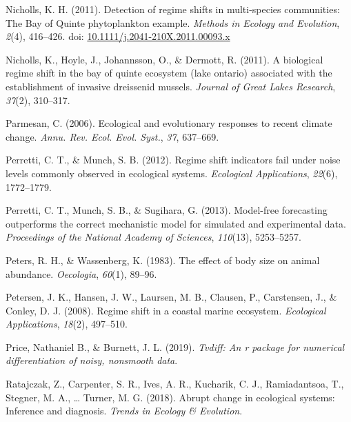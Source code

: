 \documentclass[12pt,twoside,openany]{reedthesis}
\begin{document}
\leavevmode\hypertarget{ref-nicholls_detection_2011}{}%
Nicholls, K. H. (2011). Detection of regime shifts in multi-species communities: The Bay of Quinte phytoplankton example. \emph{Methods in Ecology and Evolution}, \emph{2}(4), 416--426. doi: \href{https://doi.org/10.1111/j.2041-210X.2011.00093.x}{10.1111/j.2041-210X.2011.00093.x}

\leavevmode\hypertarget{ref-nicholls2011biological}{}%
Nicholls, K., Hoyle, J., Johannsson, O., \& Dermott, R. (2011). A biological regime shift in the bay of quinte ecosystem (lake ontario) associated with the establishment of invasive dreissenid mussels. \emph{Journal of Great Lakes Research}, \emph{37}(2), 310--317.

\leavevmode\hypertarget{ref-parmesan_ecological_2006}{}%
Parmesan, C. (2006). Ecological and evolutionary responses to recent climate change. \emph{Annu. Rev. Ecol. Evol. Syst.}, \emph{37}, 637--669.

\leavevmode\hypertarget{ref-perretti2012regime}{}%
Perretti, C. T., \& Munch, S. B. (2012). Regime shift indicators fail under noise levels commonly observed in ecological systems. \emph{Ecological Applications}, \emph{22}(6), 1772--1779.

\leavevmode\hypertarget{ref-perretti_model-free_2013}{}%
Perretti, C. T., Munch, S. B., \& Sugihara, G. (2013). Model-free forecasting outperforms the correct mechanistic model for simulated and experimental data. \emph{Proceedings of the National Academy of Sciences}, \emph{110}(13), 5253--5257.

\leavevmode\hypertarget{ref-peters1983effect}{}%
Peters, R. H., \& Wassenberg, K. (1983). The effect of body size on animal abundance. \emph{Oecologia}, \emph{60}(1), 89--96.

\leavevmode\hypertarget{ref-petersen2008regime}{}%
Petersen, J. K., Hansen, J. W., Laursen, M. B., Clausen, P., Carstensen, J., \& Conley, D. J. (2008). Regime shift in a coastal marine ecosystem. \emph{Ecological Applications}, \emph{18}(2), 497--510.

\leavevmode\hypertarget{ref-price2019tvdiff}{}%
Price, Nathaniel B., \& Burnett, J. L. (2019). \emph{Tvdiff: An r package for numerical differentiation of noisy, nonsmooth data}.

\leavevmode\hypertarget{ref-ratajczak2018abrupt}{}%
Ratajczak, Z., Carpenter, S. R., Ives, A. R., Kucharik, C. J., Ramiadantsoa, T., Stegner, M. A., \ldots{} Turner, M. G. (2018). Abrupt change in ecological systems: Inference and diagnosis. \emph{Trends in Ecology \& Evolution}.
\end{document}
